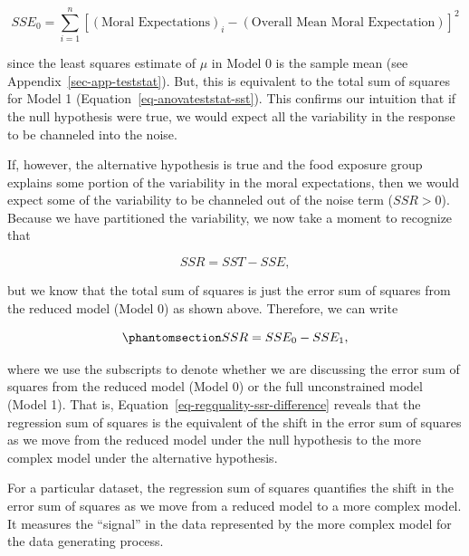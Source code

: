 \documentclass[
  letterpaper,
  DIV=11,
  numbers=noendperiod]{scrreprt}
\theoremstyle{definition}
\theoremstyle{definition}
\theoremstyle{plain}
\theoremstyle{remark}
\begin{document}
\[SSE_0 = \sum_{i=1}^{n} \left[(\text{Moral Expectations})_i - (\text{Overall Mean Moral Expectation})\right]^2\]

since the least squares estimate of \(\mu\) in Model 0 is the sample
mean (see Appendix~\ref{sec-app-teststat}). But, this is equivalent to
the total sum of squares for Model 1
(Equation~\ref{eq-anovateststat-sst}). This confirms our intuition that
if the null hypothesis were true, we would expect all the variability in
the response to be channeled into the noise.

If, however, the alternative hypothesis is true and the food exposure
group explains some portion of the variability in the moral
expectations, then we would expect some of the variability to be
channeled out of the noise term (\(SSR > 0\)). Because we have
partitioned the variability, we now take a moment to recognize that

\[SSR = SST - SSE,\]

but we know that the total sum of squares is just the error sum of
squares from the reduced model (Model 0) as shown above. Therefore, we
can write

\begin{equation}\phantomsection\label{eq-anovateststat-ssr-difference}{SSR = SSE_0 - SSE_1,}\end{equation}

where we use the subscripts to denote whether we are discussing the
error sum of squares from the reduced model (Model 0) or the full
unconstrained model (Model 1). That is,
Equation~\ref{eq-regquality-ssr-difference} reveals that the regression
sum of squares is the equivalent of the shift in the error sum of
squares as we move from the reduced model under the null hypothesis to
the more complex model under the alternative hypothesis.

\begin{tcolorbox}[enhanced jigsaw, colbacktitle=quarto-callout-tip-color!10!white, colback=white, left=2mm, title=\textcolor{quarto-callout-tip-color}{\faLightbulb}\hspace{0.5em}{Big Idea}, toptitle=1mm, leftrule=.75mm, breakable, bottomrule=.15mm, arc=.35mm, rightrule=.15mm, toprule=.15mm, coltitle=black, opacityback=0, colframe=quarto-callout-tip-color-frame, opacitybacktitle=0.6, bottomtitle=1mm, titlerule=0mm]

For a particular dataset, the regression sum of squares quantifies the
shift in the error sum of squares as we move from a reduced model to a
more complex model. It measures the ``signal'' in the data represented
by the more complex model for the data generating process.

\end{tcolorbox}
\end{document}
